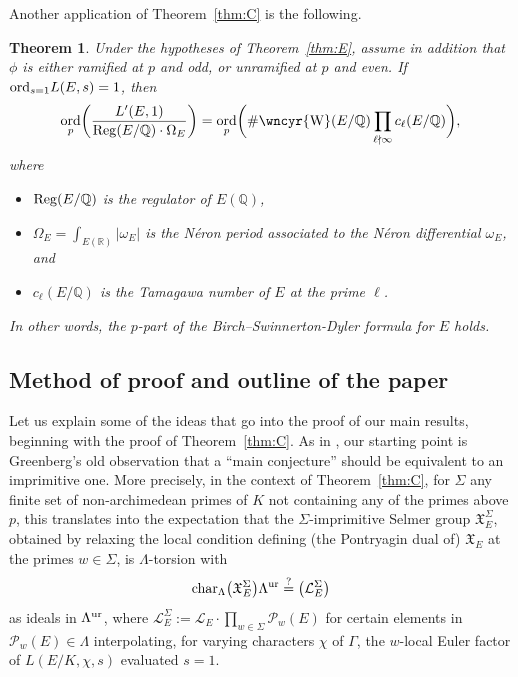\documentclass[10pt]{amsart}
\newcommand{\sha}{\text{\wncyr{W}}}
\numberwithin{equation}{section}
\newtheorem{theorem}{Theorem}
\theoremstyle{definition}
\theoremstyle{remark}
\newcommand{\Q}{\mathbb{Q}}
\DeclareMathOperator{\ord}{ord}
\begin{document}
Another application of Theorem~\ref{thm:C} is the following.
\begin{theorem}\label{thm:F}
Under the hypotheses of Theorem~\ref{thm:E}, assume in addition that $\phi$ is either ramified at $p$ and odd, or unramified at $p$ and even. If ${\rm ord}_{s=1}L(E,s)=1$, then 
\[
\ord_{p}\biggl(\frac{L'(E, 1)}{\operatorname{Reg}(E / \Q) \cdot \Omega_{E}}\biggr)=\ord_{p}\biggl(\# \sha(E / \Q) \prod_{\ell \nmid \infty} c_{\ell}(E /\Q)\biggr),
\]
where 
\begin{itemize}
\item ${\rm Reg}(E/\Q)$ is the regulator of $E(\Q)$, 
\item $\Omega_E=\int_{E(\mathbb{R})}\vert\omega_E\vert$ is the N\'{e}ron  period associated to the N\'{e}ron differential $\omega_E$, and
\item $c_\ell(E/\Q)$ is the Tamagawa number of $E$ at the prime $\ell$.
\end{itemize} 
In other words, the $p$-part of the Birch--Swinnerton-Dyler formula for $E$ holds.
\end{theorem}


\subsection{Method of proof and outline of the paper}

Let us explain some of the ideas that go into the  proof of our main results, beginning with the proof of Theorem~\ref{thm:C}. As in \cite{greenvats}, our starting point is Greenberg's old observation \cite{greenberg-nagoya} that a ``main conjecture'' should be equivalent to an imprimitive one. More precisely, in the context of Theorem~\ref{thm:C}, for $\Sigma$ any finite set of non-archimedean primes of $K$ not containing any of the primes above $p$, this translates into the expectation that the $\Sigma$-imprimitive Selmer group $\mathfrak{X}_E^\Sigma$, obtained by relaxing the local condition defining (the Pontryagin dual of) $\mathfrak{X}_E$ at the primes $w\in\Sigma$, is $\Lambda$-torsion with
\begin{equation}\label{eq:BDP-imp}
{\rm char}_\Lambda\bigl(\mathfrak{X}_E^\Sigma\bigr)\Lambda^{\rm ur}\overset{?}=\bigl(\mathcal{L}_E^\Sigma\bigr)
\end{equation}
as ideals in $\Lambda^{\rm ur}$, where $\mathcal{L}_E^\Sigma:=\mathcal{L}_E\cdot\prod_{w\in\Sigma}\mathcal{P}_w(E)$ for certain elements in $\mathcal{P}_w(E)\in\Lambda$ interpolating, for varying characters $\chi$ of $\Gamma$, the $w$-local Euler factor of $L(E/K,\chi,s)$ evaluated $s=1$. 
\end{document}
